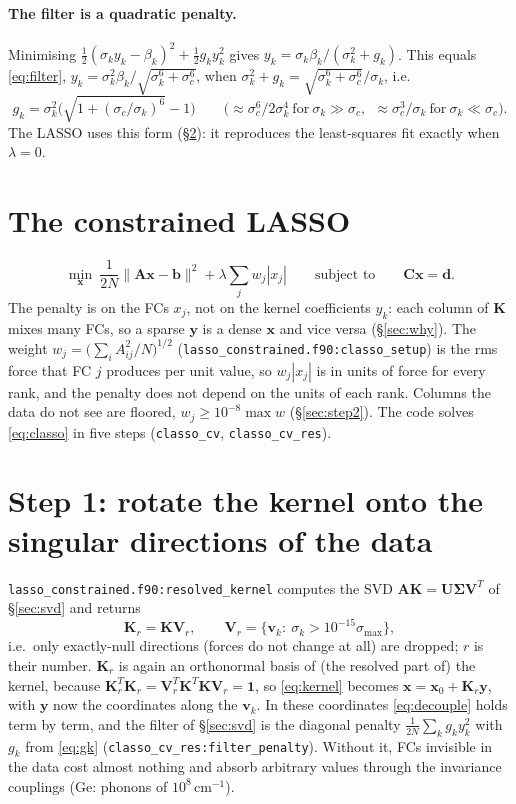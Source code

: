 \documentclass[11pt,a4paper]{article}
\newcommand{\bA}{\mathbf A}
\newcommand{\bC}{\mathbf C}
\newcommand{\bK}{\mathbf K}
\newcommand{\bU}{\mathbf U}
\newcommand{\bV}{\mathbf V}
\newcommand{\bb}{\mathbf b}
\newcommand{\bd}{\mathbf d}
\newcommand{\bv}{\mathbf v}
\newcommand{\bx}{\mathbf x}
\newcommand{\by}{\mathbf y}
\newcommand{\bSig}{\boldsymbol\Sigma}
\newcommand{\code}[1]{\texttt{#1}}
\begin{document}
\paragraph{The filter is a quadratic penalty.} Minimising $\tfrac12(\sigma_ky_k-\beta_k)^2+\tfrac12g_ky_k^2$ gives
$y_k=\sigma_k\beta_k/(\sigma_k^2+g_k)$. This equals \eqref{eq:filter},
$y_k=\sigma_k^2\beta_k/\sqrt{\sigma_k^6+\sigma_c^6}$, when $\sigma_k^2+g_k=\sqrt{\sigma_k^6+\sigma_c^6}/\sigma_k$, i.e.
\begin{equation}\label{eq:gk}
g_k=\sigma_k^2\Big(\sqrt{1+(\sigma_c/\sigma_k)^6}-1\Big)\qquad
\big(\approx\sigma_c^6/2\sigma_k^4\ \text{for}\ \sigma_k\gg\sigma_c,\ \ \approx\sigma_c^3/\sigma_k\ \text{for}\ \sigma_k\ll\sigma_c\big).
\end{equation}
The LASSO uses this form (\S\ref{sec:step1}): it reproduces the least-squares fit exactly when $\lambda=0$.

\section{The constrained LASSO}
\begin{equation}\label{eq:classo}
\min_{\bx}\ \frac1{2N}\|\bA\bx-\bb\|^2+\lambda\sum_jw_j|x_j|\qquad\text{subject to}\qquad\bC\bx=\bd .
\end{equation}
The penalty is on the FCs $x_j$, not on the kernel coefficients $y_k$: each column of $\bK$ mixes many FCs, so
a sparse $\by$ is a dense $\bx$ and vice versa (\S\ref{sec:why}). The weight $w_j=\big(\sum_i A_{ij}^2/N\big)^{1/2}$
(\code{lasso\_constrained.f90:classo\_setup}) is the rms force that FC $j$ produces per unit value, so
$w_j|x_j|$ is in units of force for every rank, and the penalty does not depend on the units of each
rank. Columns the data do not see are floored, $w_j\ge10^{-8}\max w$ (\S\ref{sec:step2}).
The code solves \eqref{eq:classo} in five steps (\code{classo\_cv}, \code{classo\_cv\_res}).

\section{Step 1: rotate the kernel onto the singular directions of the data}\label{sec:step1}
\code{lasso\_constrained.f90:resolved\_kernel} computes the SVD $\bA\bK=\bU\bSig\bV^T$ of \S\ref{sec:svd} and returns
\begin{equation}
\bK_r=\bK\bV_r,\qquad \bV_r=\{\bv_k:\ \sigma_k>10^{-15}\sigma_{\max}\},
\end{equation}
i.e.\ only exactly-null directions (forces do not change at all) are dropped; $r$ is their number.
$\bK_r$ is again an orthonormal basis of (the resolved part of) the kernel, because
$\bK_r^T\bK_r=\bV_r^T\bK^T\bK\bV_r=\mathbf 1$, so \eqref{eq:kernel} becomes $\bx=\bx_0+\bK_r\by$, with $\by$ now
the coordinates along the $\bv_k$. In these coordinates \eqref{eq:decouple} holds term by term, and the
filter of \S\ref{sec:svd} is the diagonal penalty $\frac1{2N}\sum_kg_ky_k^2$ with $g_k$ from \eqref{eq:gk}
(\code{classo\_cv\_res:filter\_penalty}). Without it, FCs invisible in the data cost almost nothing
and absorb arbitrary values through the invariance couplings (Ge: phonons of $10^8$\,cm$^{-1}$).
\end{document}
